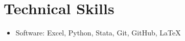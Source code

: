 \documentclass[letterpaper,11pt]{article}
\makeatletter
\newcommand{\resumeItem}[1]{
  \item\small{
    {#1 \vspace{-2pt}}
  }
}
\newcommand{\resumeProjectHeading}[2]{
    \item
    \begin{tabular*}{0.97\textwidth}{l@{\extracolsep{\fill}}r}
      \small#1 & #2 \\
    \end{tabular*}\vspace{-7pt}
}
\newcommand{\resumeSubHeadingListStart}{\begin{itemize}[leftmargin=0.15in, label={}]}
\newcommand{\resumeSubHeadingListEnd}{\end{itemize}}
\newcommand{\resumeItemListStart}{\begin{itemize}}
\newcommand{\resumeItemListEnd}{\end{itemize}\vspace{-5pt}}
\makeatother
\begin{document}



%
\section{Technical Skills}

 \begin{itemize}[leftmargin=0.15in, label={}]
    \item{
     Software{: Excel, Python, Stata, Git, GitHub, \LaTeX} \\
    }
 \end{itemize}


\end{document}
